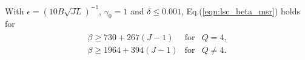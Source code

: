 			With $\epsilon=(10B\sqrt{JL})^{-1}$, $\gamma_0=1$ and $\delta\leq0.001$, Eq.(\ref{eqn:lsc_beta_msr}) holds for 
			\begin{align}
				\begin{array}{lcc}
					\beta\geq 730+267(J-1)
					&\text{for}&Q=4,\\
					\beta\geq 1964+394(J-1)
					&\text{for}&Q\neq4.\\
				\end{array}	\nonumber
			\end{align} 